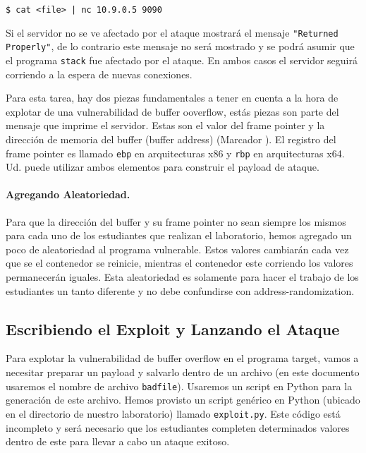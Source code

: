 \begin{lstlisting}
$ cat <file> | nc 10.9.0.5 9090
\end{lstlisting}

Si el servidor no se ve afectado por el ataque mostrará el mensaje \texttt{"Returned Properly"}, de lo contrario este mensaje no será mostrado y se podrá asumir que el programa 
\texttt{stack} fue afectado por el ataque.
En ambos casos el servidor seguirá corriendo a la espera de nuevas conexiones.

Para esta tarea, hay dos piezas fundamentales a tener en cuenta a la hora de explotar de una vulnerabilidad de buffer ooverflow, estás piezas son parte del mensaje que imprime el servidor.
Estas son el valor del frame pointer y la dirección de memoria del buffer (buffer address) (Marcador ). El registro del frame pointer es llamado \texttt{ebp} en arquitecturas x86 y \texttt{rbp} en arquitecturas x64.
Ud. puede utilizar ambos elementos para construir el payload de ataque.

\paragraph{Agregando Aleatoriedad.} Para que la dirección del buffer y su frame pointer no sean siempre los mismos para cada uno de los estudiantes que realizan el laboratorio, hemos agregado un poco de aleatoriedad al programa vulnerable. Estos valores cambiarán cada vez que se el contenedor se reinicie, mientras el contenedor este corriendo los valores permanecerán iguales. Esta aleatoriedad es solamente para hacer el trabajo de los estudiantes un tanto diferente y no debe confundirse con address-randomization.


\subsection{Escribiendo el Exploit y Lanzando el Ataque} 

Para explotar la vulnerabilidad de buffer overflow en el programa target, vamos a necesitar preparar un payload y salvarlo dentro de un archivo (en este documento usaremos el nombre de archivo \texttt{badfile}).
Usaremos un script en Python para la generación de este archivo. 
Hemos provisto un script genérico en Python (ubicado en el directorio de nuestro laboratorio) llamado \texttt{exploit.py}.
Este código está incompleto y será necesario que los estudiantes completen determinados valores dentro de este para llevar a cabo un ataque exitoso.


